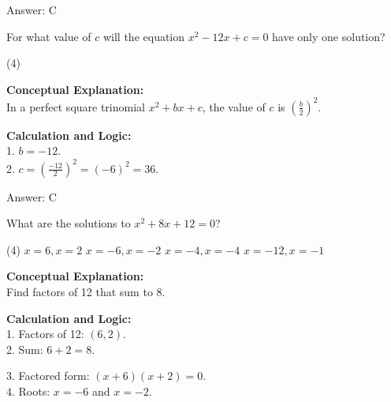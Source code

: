 \documentclass[11pt,paper=a4,answers]{exam}
\begin{document}
\begin{questions}
\begin{solution}
Answer: \colorbox{yellow!100}{C}
\end{solution}

\vspace{30pt}

\question
For what value of $c$ will the equation $x^2 - 12x + c = 0$ have only one solution?
\begin{tasks}(4)
\end{tasks}

\begin{solution}
\textbf{Conceptual Explanation:} \\
In a perfect square trinomial $x^2 + bx + c$, the value of $c$ is $(\frac{b}{2})^2$.

\vspace{15pt}

\textbf{Calculation and Logic:} \\
1. $b = -12$. \\
2. $c = (\frac{-12}{2})^2 = (-6)^2 = 36$.

\vspace{20pt}

Answer: \colorbox{yellow!100}{C}
\end{solution}

\vspace{30pt}

\question
What are the solutions to $x^2 + 8x + 12 = 0$?
\begin{tasks}(4)
    \task $x = 6, x = 2$
    \task $x = -6, x = -2$
    \task $x = -4, x = -4$
    \task $x = -12, x = -1$
\end{tasks}

\begin{solution}
\textbf{Conceptual Explanation:} \\
Find factors of 12 that sum to 8.

\vspace{15pt}

\textbf{Calculation and Logic:} \\
1. Factors of 12: $(6, 2)$. \\
2. Sum: $6 + 2 = 8$.

\vspace{10pt}

3. Factored form: $(x + 6)(x + 2) = 0$. \\
4. Roots: $x = -6$ and $x = -2$.


\end{solution}
\end{questions}
\end{document}
